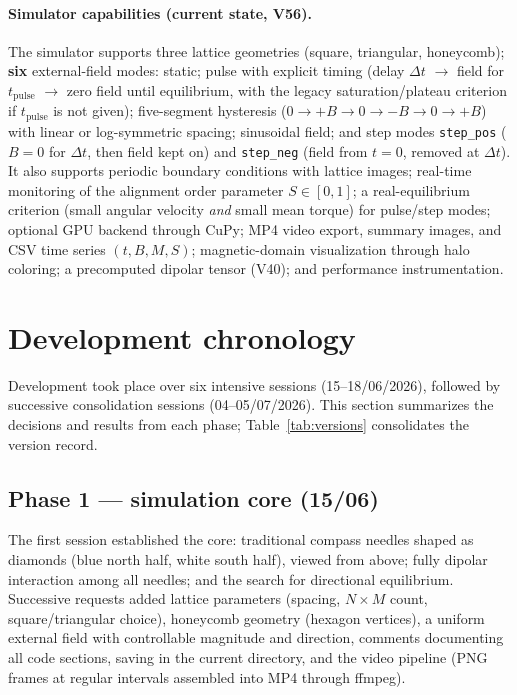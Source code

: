 \documentclass[11pt,a4paper]{article}
\newcommand{\code}[1]{\texttt{#1}}
\begin{document}
\paragraph{Simulator capabilities (current state, V56).}
The simulator supports three lattice geometries (square, triangular, honeycomb); \textbf{six} external-field modes: static; pulse with explicit timing (delay $\Delta t$ $\to$ field for $t_{\mathrm{pulse}}$ $\to$ zero field until equilibrium, with the legacy saturation/plateau criterion if $t_{\mathrm{pulse}}$ is not given); five-segment hysteresis ($0 \to +B \to 0 \to -B \to 0 \to +B$) with linear or log-symmetric spacing; sinusoidal field; and step modes \code{step\_pos} ($B{=}0$ for $\Delta t$, then field kept on) and \code{step\_neg} (field from $t{=}0$, removed at $\Delta t$). It also supports periodic boundary conditions with lattice images; real-time monitoring of the alignment order parameter $S \in [0,1]$; a real-equilibrium criterion (small angular velocity \emph{and} small mean torque) for pulse/step modes; optional GPU backend through CuPy; MP4 video export, summary images, and CSV time series $(t, B, M, S)$; magnetic-domain visualization through halo coloring; a precomputed dipolar tensor (V40); and performance instrumentation.

\section{Development chronology}

Development took place over six intensive sessions (15--18/06/2026), followed by successive consolidation sessions (04--05/07/2026). This section summarizes the decisions and results from each phase; Table~\ref{tab:versions} consolidates the version record.

\subsection{Phase 1 --- simulation core (15/06)}

The first session established the core: traditional compass needles shaped as diamonds (blue north half, white south half), viewed from above; fully dipolar interaction among all needles; and the search for directional equilibrium. Successive requests added lattice parameters (spacing, $N \times M$ count, square/triangular choice), honeycomb geometry (hexagon vertices), a uniform external field with controllable magnitude and direction, comments documenting all code sections, saving in the current directory, and the video pipeline (PNG frames at regular intervals assembled into MP4 through ffmpeg).
\end{document}
